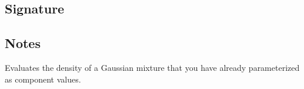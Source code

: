 \documentclass[letterpaper,10pt,english]{sphinxmanual}
\begin{document}
\subsection{Signature}
\label{\detokenize{api_reference:id25}}
\begin{sphinxVerbatim}[commandchars=\\\{\}]
\end{sphinxVerbatim}


\subsection{Notes}
\label{\detokenize{api_reference:id26}}
\sphinxAtStartPar
Evaluates the density of a Gaussian mixture that you have already parameterized as component  values.
\end{document}
